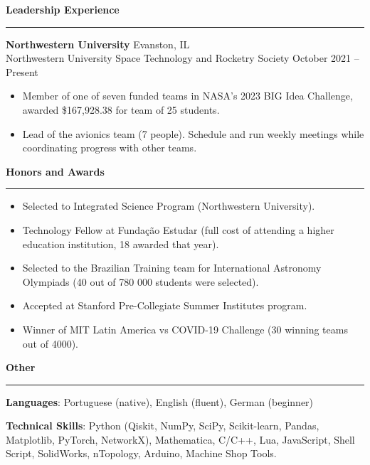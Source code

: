 \documentclass{article}
\begin{document}
\large \textbf{Leadership Experience}
\vspace{0.2\baselineskip}
\hrule\normalsize
\textbf{Northwestern University} \hfill Evanston, IL \\
Northwestern University Space Technology and Rocketry Society \hfill October 2021 – Present
\begin{itemize}[leftmargin=*]
    \item Member of one of seven funded teams in NASA’s 2023 BIG Idea Challenge, awarded \$167,928.38 for team of 25 students.
    
    \item Lead of the avionics team (7 people). Schedule and run weekly meetings while coordinating progress with other teams.

\end{itemize}

\large \textbf{Honors and Awards}
\vspace{0.2\baselineskip}
\hrule
\small
\begin{itemize}[leftmargin=*]
    \item Selected to Integrated Science Program (Northwestern University).
    \item Technology Fellow at Fundação Estudar (full cost of attending a higher education institution, 18 awarded that year). %
    \item Selected to the Brazilian Training team for International Astronomy Olympiads (40 out of 780 000 students were selected).
    \item Accepted at Stanford Pre-Collegiate Summer Institutes program.
    \item Winner of MIT Latin America vs COVID-19 Challenge (30 winning teams out of 4000).
\end{itemize}


\large \textbf{Other}
\vspace{0.2\baselineskip}
\hrule\normalsize

\textbf{Languages}: Portuguese (native), English (fluent), German (beginner)

\textbf{Technical Skills}: Python (Qiskit, NumPy, SciPy, Scikit-learn, Pandas, Matplotlib, PyTorch, NetworkX), Mathematica, C/C++, Lua, JavaScript, Shell Script, SolidWorks, nTopology, Arduino, Machine Shop Tools.
\end{document}
